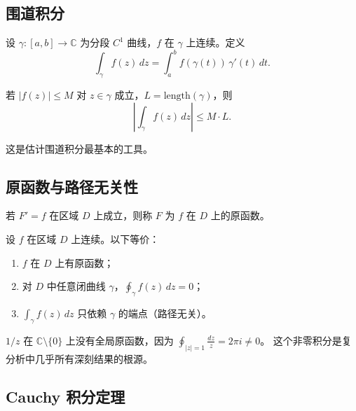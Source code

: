 
\subsection{围道积分}

\begin{definition}
设 $\gamma: [a,b] \to \mathbb{C}$ 为分段 $C^1$ 曲线，$f$ 在 $\gamma$ 上连续。定义
\[
  \int_\gamma f(z)\,dz = \int_a^b f(\gamma(t))\,\gamma'(t)\,dt.
\]
\end{definition}

\begin{lemma}
若 $|f(z)| \leq M$ 对 $z \in \gamma$ 成立，$L = \text{length}(\gamma)$，则
\[
  \left|\int_\gamma f(z)\,dz\right| \leq M \cdot L.
\]
\end{lemma}

这是估计围道积分最基本的工具。

\subsection{原函数与路径无关性}

\begin{definition}
若 $F' = f$ 在区域 $D$ 上成立，则称 $F$ 为 $f$ 在 $D$ 上的原函数。
\end{definition}

\begin{theorem}
设 $f$ 在区域 $D$ 上连续。以下等价：
\begin{enumerate}  \item $f$ 在 $D$ 上有原函数；
  \item 对 $D$ 中任意闭曲线 $\gamma$，$\displaystyle\oint_\gamma f(z)\,dz = 0$；
  \item $\displaystyle\int_\gamma f(z)\,dz$ 只依赖 $\gamma$ 的端点（路径无关）。
\end{enumerate}
\end{theorem}

\begin{remark}
$1/z$ 在 $\mathbb{C}\setminus\{0\}$ 上没有全局原函数，因为
$\displaystyle\oint_{|z|=1} \frac{dz}{z} = 2\pi i \neq 0$。
这个非零积分是复分析中几乎所有深刻结果的根源。
\end{remark}

\subsection{Cauchy 积分定理}

